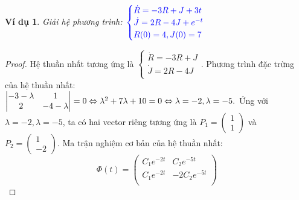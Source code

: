 \documentclass[a4paper]{article}
\newtheorem{example}{Ví dụ}
\begin{document}
\begin{example}
    Giải hệ phương trình: 
    $\textcolor{blue}{
    \begin{cases}
    \dot{R}=-3R + J + 3t\\
    \dot{J}=2R - 4J  + e^{-t}\\
    R(0)=4,J(0)= 7
    \end{cases}
    }$
\end{example}
\begin{proof}
    Hệ thuần nhất tương ứng là $\begin{cases}
    \dot{R}=-3R + J \\
    \dot{J}=2R - 4J \\
    \end{cases}$. Phương trình đặc trừng của hệ thuần nhất: $\begin{vmatrix}
-3 - \lambda & 1 \\
2 & -4 - \lambda
\end{vmatrix} = 0 \Leftrightarrow \lambda^{2} + 7\lambda + 10 = 0 \Leftrightarrow \lambda = -2, \lambda = -5.\\$
    Ứng với $\lambda = -2, \lambda = -5$, ta có hai vector riêng tương ứng là $P_1 = \begin{pmatrix}
    1 \\
    1
\end{pmatrix}$ và $P_2 = \begin{pmatrix}
    1 \\ 
    -2
\end{pmatrix}$.
Ma trận nghiệm cơ bản của hệ thuần nhất:
$$\Phi(t) = \begin{pmatrix}
     C_1 e^{-2t} & C_2 e^{-5t} \\
     C_1 e^{-2t} & -2C_2 e^{-5t} \\ 
 \end{pmatrix}$$


\end{proof}
\end{document}
